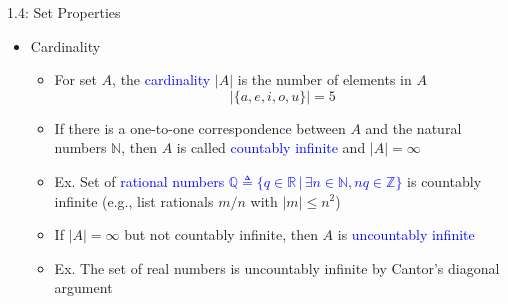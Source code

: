 \documentclass[10pt,english]{beamer}
\begin{document}
\begin{frame}{1.4: Set Properties}

\begin{itemize}
\setlength\itemsep{3mm}

\item<1-> Cardinality \vspace{1mm}
\begin{itemize} 
  \setlength\itemsep{1.5mm}
  \item For set $A$, the \textcolor{blue}{cardinality} $|A|$ is the number of elements in $A$
  \[ |\{ a,e,i,o,u \}| = 5 \]
  \item If there is a one-to-one correspondence between $A$ and the natural numbers $\mathbb{N}$, then $A$ is called \textcolor{blue}{countably infinite} and  $|A| = \infty$
  \item Ex. Set of \textcolor{blue}{rational numbers $\mathbb{Q} \triangleq \{ q \in \mathbb{R} \,|\, \exists n \in \mathbb{N}, nq \in \mathbb{Z} \}$} is countably infinite (e.g., list rationals $m/n$ with $|m|\leq n^2$)
  \item If $|A| = \infty$ but not countably infinite, then $A$ is \textcolor{blue}{uncountably infinite}
  \item Ex. The set of real numbers is uncountably infinite by Cantor's diagonal argument
  
\end{itemize}
\end{itemize}
\end{frame}

\def\firstcircle{(0,0) circle (1.5cm)}
\def\secondcircle{(0:2cm) circle (1.5cm)}


\end{document}
